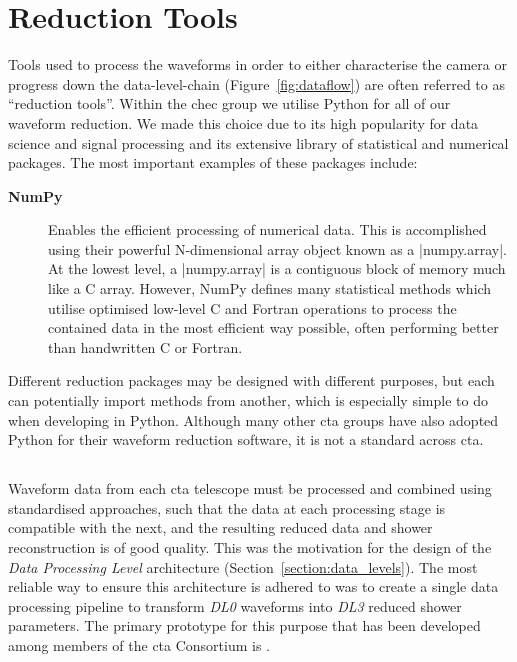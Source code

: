 \section{Reduction Tools}

Tools used to process the waveforms in order to either characterise the camera or progress down the data-level-chain (Figure~\ref{fig:dataflow}) are often referred to as ``reduction tools''. Within the \gls{chec} group we utilise Python for all of our waveform reduction. We made this choice due to its high popularity for data science and signal processing and its extensive library of statistical and numerical packages. The most important examples of these packages include:

\begin{description}
\item [\textbf{NumPy\footnotemark}]  Enables the efficient processing of numerical data. This is accomplished using their powerful N-dimensional array object known as a |numpy.array|. At the lowest level, a |numpy.array| is a contiguous block of memory much like a C array. However, NumPy defines many statistical methods which utilise optimised low-level C and Fortran operations to process the contained data in the most efficient way possible, often performing better than handwritten C or Fortran.
\end{description}

Different reduction packages may be designed with different purposes, but each can potentially import methods from another, which is especially simple to do when developing in Python. Although many other \gls{cta} groups have also adopted Python for their waveform reduction software, it is not a standard across \gls{cta}.

\subsection{}

Waveform data from each \gls{cta} telescope must be processed and combined using standardised approaches, such that the data at each processing stage is compatible with the next, and the resulting reduced data and shower reconstruction is of good quality. This was the motivation for the design of the \textit{Data Processing Level} architecture (Section~\ref{section:data_levels}). The most reliable way to ensure this architecture is adhered to was to create a single data processing pipeline to transform \textit{DL0} waveforms into \textit{DL3} reduced shower parameters. The primary prototype for this purpose that has been developed among members of the \gls{cta} Consortium is .



